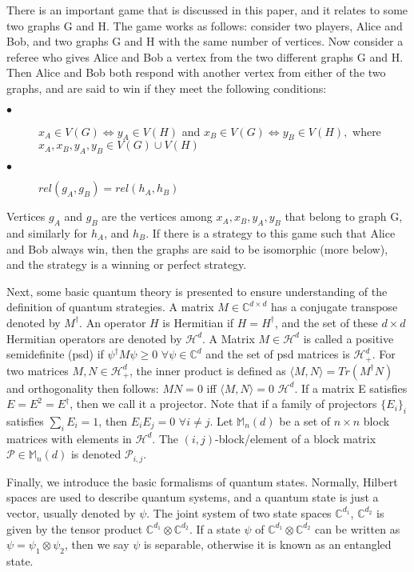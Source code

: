 \documentclass[12pt]{article}
\begin{document}
There is an important game that is discussed in this paper, and it relates to some two graphs G and H. The game works as follows: consider two players, Alice and Bob, and two graphs G and H with the same number of vertices. Now consider a referee who gives Alice and Bob a vertex from the two different graphs G and H. Then Alice and Bob both respond with another vertex from either of the two graphs, and are said to win if they meet the following conditions:
\begin{description}
  \item[$\bullet$] $x_A \in V(G) \Leftrightarrow y_A \in V(H)$ and  $x_B \in V(G)\Leftrightarrow y_B \in V(H), $ where $x_A, x_B, y_A, y_B \in V(G) \cup V(H)$
  \item[$\bullet$] $rel(g_A, g_B) = rel(h_A, h_B)$
\end{description}
Vertices $g_A$ and $g_B$ are the vertices among $x_A, x_B, y_A, y_B$ that belong to graph G, and similarly for $h_A$, and $h_B$.
If there is a strategy to this game such that Alice and Bob always win, then the graphs are said to be isomorphic (more below), and the strategy is a winning or perfect strategy. 

Next, some basic quantum theory is presented to ensure understanding of the definition of quantum strategies. A matrix $M \in \mathbb{C}^{d \times d}$ has a conjugate transpose denoted by $M^\dag$. An operator $H$ is Hermitian if $H = {H^{\dag}}$, and the set of these $d \times d$ Hermitian operators are denoted by $\mathcal{H}^d$. A Matrix $M \in \mathcal{H}^d$ is called a positive semidefinite (psd) if $\psi^\dag M \psi \geq 0$ $\forall \psi \in \mathbb{C}^d$ and the set of psd matrices is $\mathcal{H}^d_+$. For two matrices $M, N \in \mathcal{H}^d_+$, the inner product is defined as $\langle M, N\rangle = Tr(M^\dag N)$ and orthogonality then follows: $MN = 0$ iff $\langle M, N \rangle = 0$ $\mathcal{H}^d$. If a matrix E satisfies $E = E^2 = E^\dag$, then we call it a projector. Note that if a family of projectors $\{E_i\}_i$ satisfies $\sum_iE_i = 1$, then $E_iE_j = 0$ $\forall i \neq j$. Let $\mathbb{M}_n(d)$ be a set of $n \times n$ block matrices with elements in $\mathcal{H}^d$. The $(i, j)$-block/element of a block matrix $\mathcal{P} \in \mathbb{M}_n(d)$ is denoted $\mathcal{P}_{i, j}$.

Finally, we introduce the basic formalisms of quantum states. Normally, Hilbert spaces are used to describe quantum systems, and a quantum state is just a vector, usually denoted by $\psi$. The joint system of two state spaces $\mathbb{C}^{d_1}$, $\mathbb{C}^{d_2}$ is given by the tensor product $\mathbb{C}^{d_1} \otimes \mathbb{C}^{d_2}$. If a state $\psi$ of $\mathbb{C}^{d_1} \otimes \mathbb{C}^{d_2}$ can be written as $\psi = \psi_1 \otimes \psi_2$, then we say $\psi$ is separable, otherwise it is known as an entangled state.
\end{document}
